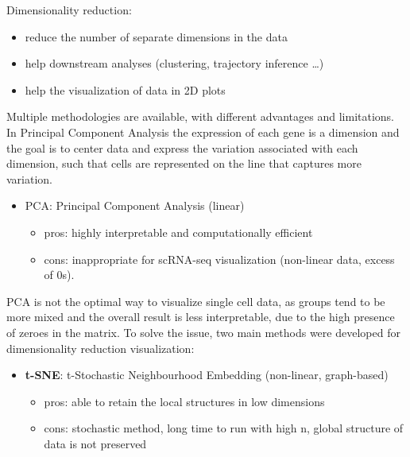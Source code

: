 Dimensionality reduction:

\begin{itemize}
\tightlist
\item
  reduce the number of separate dimensions in the data
\item
  help downstream analyses (clustering, trajectory inference \ldots)
\item
  help the visualization of data in 2D plots
\end{itemize}

Multiple methodologies are available, with different advantages and
limitations. In Principal Component Analysis the expression of each gene
is a dimension and the goal is to center data and express the variation
associated with each dimension, such that cells are represented on the
line that captures more variation.

\begin{itemize}
\tightlist
\item
  PCA: Principal Component Analysis (linear)

  \begin{itemize}
  \tightlist
  \item
    pros: highly interpretable and computationally efficient
  \item
    cons: inappropriate for scRNA-seq visualization (non-linear data,
    excess of 0s).
  \end{itemize}
\end{itemize}

PCA is not the optimal way to visualize single cell data, as groups tend
to be more mixed and the overall result is less interpretable, due to
the high presence of zeroes in the matrix. To solve the issue, two main
methods were developed for dimensionality reduction visualization:

\begin{itemize}
\tightlist
\item
  \textbf{t-SNE}: t-Stochastic Neighbourhood Embedding (non-linear,
  graph-based)

  \begin{itemize}
  \tightlist
  \item
    pros: able to retain the local structures in low dimensions
  \item
    cons: stochastic method, long time to run with high n, global
    structure of data is not preserved
  \end{itemize}
\end{itemize}

